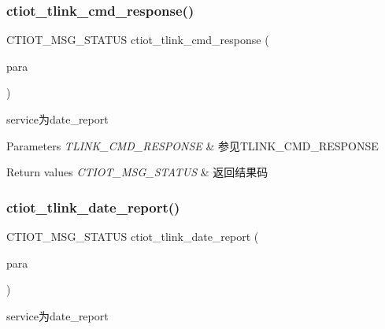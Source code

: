 \subsubsection{\texorpdfstring{ctiot\+\_\+tlink\+\_\+cmd\+\_\+response()}{ctiot\_tlink\_cmd\_response()}}
{\footnotesize\ttfamily C\+T\+I\+O\+T\+\_\+\+M\+S\+G\+\_\+\+S\+T\+A\+T\+US ctiot\+\_\+tlink\+\_\+cmd\+\_\+response (\begin{DoxyParamCaption}\item[{\mbox{\hyperlink{structtlink__cmd__response}{T\+L\+I\+N\+K\+\_\+\+C\+M\+D\+\_\+\+R\+E\+S\+P\+O\+N\+SE}} $\ast$}]{para }\end{DoxyParamCaption})}



service为date\+\_\+report 


\begin{DoxyParams}{Parameters}
{\em T\+L\+I\+N\+K\+\_\+\+C\+M\+D\+\_\+\+R\+E\+S\+P\+O\+N\+SE} & 参见T\+L\+I\+N\+K\+\_\+\+C\+M\+D\+\_\+\+R\+E\+S\+P\+O\+N\+SE\\
\hline
\end{DoxyParams}

\begin{DoxyRetVals}{Return values}
{\em C\+T\+I\+O\+T\+\_\+\+M\+S\+G\+\_\+\+S\+T\+A\+T\+US} & 返回结果码 \\
\hline
\end{DoxyRetVals}
\mbox{\label{group___a_p_i_xE6_x8E_xA5_xE5_x8F_xA3_gaff29deec3201f1522d4a7b9f1bcf6ccc}} 
\subsubsection{\texorpdfstring{ctiot\+\_\+tlink\+\_\+date\+\_\+report()}{ctiot\_tlink\_date\_report()}}
{\footnotesize\ttfamily C\+T\+I\+O\+T\+\_\+\+M\+S\+G\+\_\+\+S\+T\+A\+T\+US ctiot\+\_\+tlink\+\_\+date\+\_\+report (\begin{DoxyParamCaption}\item[{\mbox{\hyperlink{structtlink__data__report}{T\+L\+I\+N\+K\+\_\+\+D\+A\+T\+A\+\_\+\+R\+E\+P\+O\+RT}} $\ast$}]{para }\end{DoxyParamCaption})}



service为date\+\_\+report 


